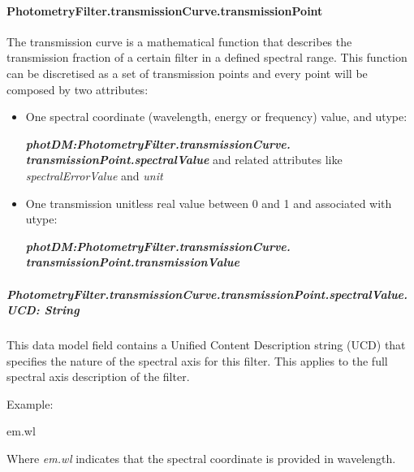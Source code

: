 \documentclass[11pt,a4paper]{ivoa}
\begin{document}
\paragraph{PhotometryFilter.transmissionCurve.transmissionPoint} 
The transmission curve is a mathematical function that describes the transmission 
fraction of a certain filter in a defined spectral range. This function can be discretised 
as a set of transmission points and every point will be composed by two attributes:
\par

\begin{itemize}
	\item One spectral coordinate (wavelength, energy or frequency) value, and utype:\par

\begin{center}
{\fontsize{10pt}{12.0pt}\selectfont 
\textbf{\textit{photDM:PhotometryFilter.transmissionCurve.
transmissionPoint.spectralValue}}
and related attributes like \textit{spectralErrorValue} and \textit{unit} }
\end{center}\par

	\item One transmission unitless real value between 0 and 1 and associated with
	utype:\par
\begin{center}
{\fontsize{10pt}{12.0pt}\selectfont \textbf{\textit{photDM:PhotometryFilter.transmissionCurve.
transmissionPoint.transmissionValue}}}
\end{center}\par

\end{itemize}\par
\subparagraph{PhotometryFilter.transmissionCurve.transmissionPoint.spectralValue.UCD: String}
This data model field contains a Unified Content Description string (UCD) 
\citep{2018ivoa.spec.0527P} that specifies the nature of the spectral axis for this filter. 
This applies to the full spectral axis description of the filter.
\par

Example:
\par

em.wl

Where \textit{em.wl }indicates that the spectral coordinate is provided in wavelength.
\par
\end{document}
